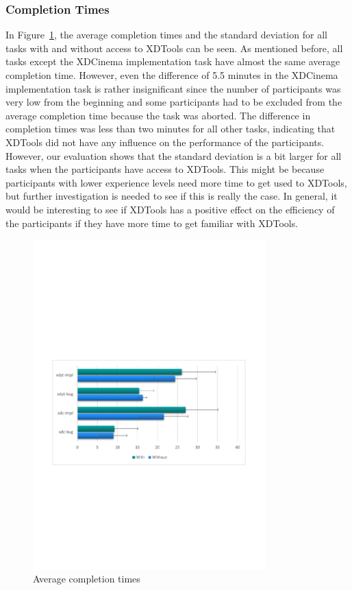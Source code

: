\subsubsection{Completion Times}

In Figure~\ref{fig:completion_times}, the average completion times and the standard deviation for all tasks with and without access to XDTools can be seen. As mentioned before, all tasks except the XDCinema implementation task have almost the same average completion time. However, even the difference of 5.5 minutes in the XDCinema implementation task is rather insignificant since the number of participants was very low from the beginning and some participants had to be excluded from the average completion time because the task was aborted. The difference in completion times was less than two minutes for all other tasks, indicating that XDTools did not have any influence on the performance of the participants. However, our evaluation shows that the standard deviation is a bit larger for all tasks when the participants have access to XDTools. This might be because participants with lower experience levels need more time to get used to XDTools, but further investigation is needed to see if this is really the case. In general, it would be interesting to see if XDTools has a positive effect on the efficiency of the participants if they have more time to get familiar with XDTools.

\begin{figure}[H]
  \centering
    \includegraphics[width=0.8\textwidth]{images/charts/completion_times.pdf}
	\caption[Average completion times]{Average completion times}
	\label{fig:completion_times}
\end{figure}

